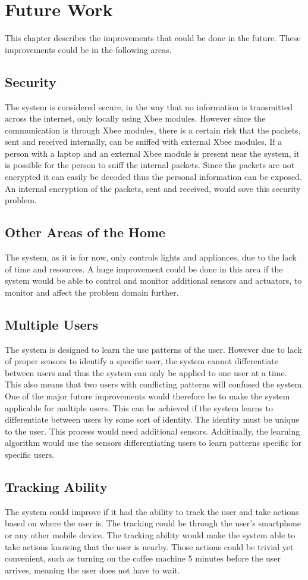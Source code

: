 \chapter{Future Work}
\label{chap:future_work}
This chapter describes the improvements that could be done in the future. These improvements could be in the following areas.

\section{Security}
The system is considered secure, in the way that no information is transmitted across the internet, only locally using Xbee modules. However since the communication is through Xbee modules, there is a certain risk that the packets, sent and received internally, can be sniffed with external Xbee modules. If a person with a laptop and an external Xbee module is present near the system, it is possible for the person to sniff the internal packets. Since the packets are not encrypted it can easily be decoded thus the personal information can be exposed. An internal encryption of the packets, sent and received, would sove this security problem.

\section{Other Areas of the Home}
The system, as it is for now, only controls lights and appliances, due to the lack of time and resources. A huge improvement could be done in this area if the system would be able to control and monitor additional sensors and actuators, to monitor and affect the problem domain further.

\section{Multiple Users}
The system is designed to learn the use patterns of the user. However due to lack of proper sensors to identify a specific user, the system cannot differentiate between users and thus the system can only be applied to one user at a time. This also means that two users with conflicting patterns will confused the system. One of the major future improvements would therefore be to make the system applicable for multiple users. This can be achieved if the system learns to differentiate between users by some sort of identity. The identity must be unique to the user. This process would need additional sensors. Additinally, the learning algorithm would use the sensors differentiating users to learn patterns specific for specific users.

\section{Tracking Ability}
The system could improve if it had the ability to track the user and take actions based on where the user is. The tracking could be through the user's smartphone or any other mobile device. The tracking ability would make the system able to take actions knowing that the user is nearby. Those actions could be trivial yet convenient, such as turning on the coffee machine 5 minutes before the user arrives, meaning the user does not have to wait.